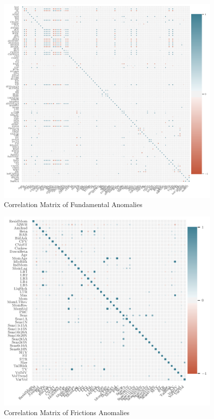 	\begin{center}
		\begin{figure}
			\includegraphics[width=\textwidth,height=\textheight,keepaspectratio]{Figures/corrplot_funds.pdf}
			\caption{Correlation Matrix of Fundamental Anomalies}
			\label{fig:corrplot_funds}
		\end{figure}
	\end{center}
	
	\begin{center}
		\begin{figure}
			\includegraphics[width=\textwidth,height=\textheight,keepaspectratio]{Figures/corrplot_frictions.pdf}
			\caption{Correlation Matrix of Frictions Anomalies}
			\label{fig:corrplot_frictions}
		\end{figure}
	\end{center}
	

